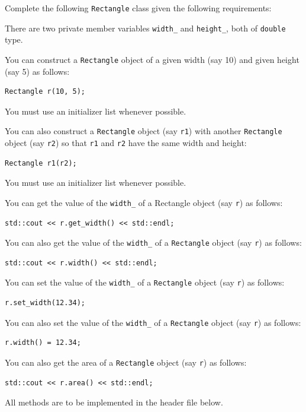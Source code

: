 \newpage
\nextq
Complete the following \verb!Rectangle! class given the following requirements:
\begin{enumerate}[nosep]

\li There are two private member variables \verb!width_! and \verb!height_!,
    both of \verb!double! type.

\li You can construct a \verb!Rectangle! object of a given width (say 10) and
    given height (say 5) as follows:
    \begin{Verbatim}[frame=single,fontsize=\small]
Rectangle r(10, 5);
    \end{Verbatim}
You must use an initializer list whenever possible.

\li You can also construct a \verb!Rectangle! object (say \verb!r1!) with
    another \verb!Rectangle! object (say \verb!r2!) so that
    \verb!r1! and \verb!r2! have the same width and height:
    \begin{Verbatim}[frame=single,fontsize=\small]
Rectangle r1(r2);
    \end{Verbatim}
    You must use an initializer list whenever possible.

\li You can get the value of the \verb!width_! of a Rectangle object
    (say \verb!r!) as follows:
    \begin{Verbatim}[frame=single,fontsize=\small]
std::cout << r.get_width() << std::endl;
    \end{Verbatim}

\li You can also get the value of the \verb!width_! of a
    \verb!Rectangle! object (say \verb!r!) as follows:
    \begin{Verbatim}[frame=single,fontsize=\small]
std::cout << r.width() << std::endl;
    \end{Verbatim}

\li You can set the value of the \verb!width_! of a \verb!Rectangle! object
    (say \verb!r!) as follows:
    \begin{Verbatim}[frame=single,fontsize=\small]
r.set_width(12.34);
    \end{Verbatim}

\li You can also set the value of the \verb!width_! of a \verb!Rectangle!
    object (say \verb!r!) as follows:
    \begin{Verbatim}[frame=single,fontsize=\small]
r.width() = 12.34;
    \end{Verbatim}
    
\li You can also get the area of a \verb!Rectangle! object (say \verb!r!) as
    follows:
    \begin{Verbatim}[frame=single,fontsize=\small]
std::cout << r.area() << std::endl;
    \end{Verbatim}
    
\end{enumerate}
All methods are to be implemented in the header file below.

